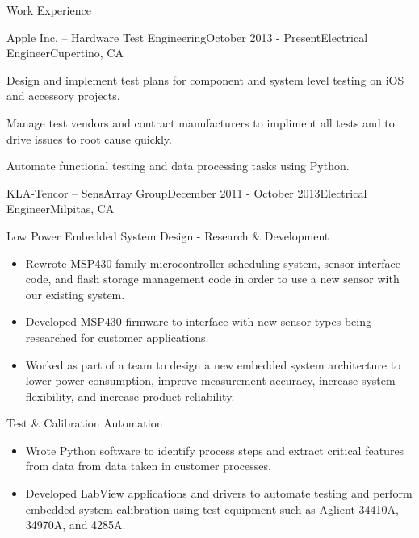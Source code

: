 \documentclass{resume} %
\begin{document}
\vspace{0.5em}
\begin{rSection}{Work Experience}
\vspace{-0.5em}
\begin{rSubsection}{Apple Inc. -- Hardware Test Engineering}{October 2013 - Present}{Electrical Engineer}{Cupertino, CA}
\item Design and implement test plans for component and system level testing on iOS and accessory projects.
\item Manage test vendors and contract manufacturers to impliment all tests and to drive issues to root cause quickly.
\item Automate functional testing and data processing tasks using Python.
\end{rSubsection}


\ssquish
\begin{rSubsection2}{KLA-Tencor -- SensArray Group}{December 2011 - October 2013}{Electrical Engineer}{Milpitas, CA}
\item Low Power Embedded System Design - Research \& Development 
\begin{itemize}
\itemsep -0.5em \vspace{-0.5em}
\renewcommand{\labelitemi}{-}
\item Rewrote MSP430 family microcontroller scheduling system, sensor interface code, and flash storage management code in order to use a new sensor with our existing system.
\item Developed MSP430 firmware to interface with new sensor types being researched for customer applications.
\item Worked as part of a team to design a new embedded system architecture to lower power consumption, improve measurement accuracy, increase system flexibility, and increase product reliability.
\end{itemize}

\item Test \& Calibration Automation
\begin{itemize}
\itemsep -0.5em \vspace{-0.5em}
\renewcommand{\labelitemi}{-}
\item Wrote Python software to identify process steps and extract critical features from data from data taken in customer processes. 
\item Developed LabView applications and drivers to automate testing and perform embedded system calibration using test equipment such as Aglient 34410A, 34970A, and 4285A.
\end{itemize}
\end{rSubsection2}


\end{rSection}
\end{document}
